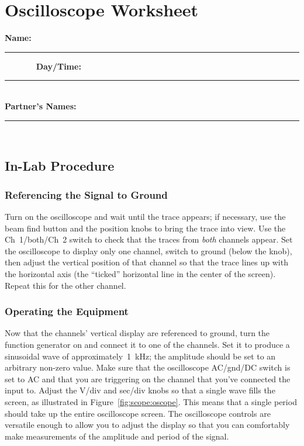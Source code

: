 \vfill
\pagebreak

\renewcommand{\thesection}{\thechapter.W}

\section{Oscilloscope Worksheet}

{\bf \Large Name:}~ \rule{5cm}{.1mm}~~~~~~~
{\bf \Large Day/Time:}~\rule{3cm}{.1mm}\\
{\bf \Large Partner's Names:}~\rule{6cm}{.1mm}\\
   \subsection{In-Lab Procedure}

\subsubsection{Referencing the Signal to Ground}
\label{sec:scope:ground}
Turn on the oscilloscope and wait until the trace appears; if necessary, use 
the beam find button and the position knobs to bring the trace into view. Use
the Ch~1/both/Ch~2 switch to check that the traces from {\it both} channels
appear.  Set the oscilloscope to display only one channel, switch to ground
(below the knob), then adjust the 
vertical position of that channel so that the trace lines up with the 
horizontal axis (the ``ticked'' horizontal line in the center of the screen).
Repeat this for the other channel.

\subsubsection{Operating the Equipment}
\label{sec:scope:oper}
Now that the channels' vertical display are referenced to ground, 
turn the function generator on and connect 
it to one of the channels.  Set it to produce a sinusoidal wave of 
approximately~1~kHz; the amplitude should be set to an arbitrary non-zero 
value. Make sure that the oscilloscope AC/gnd/DC switch is set to AC and that 
you are triggering on the channel that you've connected the input to.  Adjust 
the V/div and sec/div knobs so that a single wave fills the screen, as 
illustrated in Figure~\ref{fig:scope:oscope}.  This means that a single
period should take up the entire oscilloscope screen.  The oscilloscope
controls are
versatile enough to allow you to adjust the display so that you can comfortably
make measurements of the amplitude and period of the signal. \\

